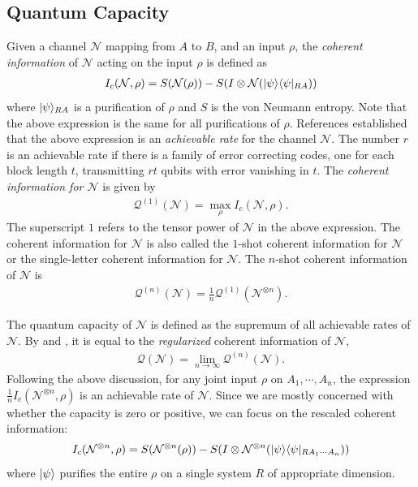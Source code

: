 \documentclass[11pt]{article}
\DeclarePairedDelimiter\bra{\langle}{\rvert}
\DeclarePairedDelimiter\ket{\lvert}{\rangle}
\begin{document}
\subsection{Quantum Capacity}
Given a channel $\mathcal{N}$ mapping from $A$ to $B$, and an input $\rho$, the \emph{coherent information} of $\mathcal{N}$ acting on the input $\rho$ is defined as 
\begin{align}\label{eq:channelcohinfo}
    I_c(\mathcal{N}, \rho) = S(\mathcal{N}(\rho)) - S(I \otimes \mathcal{N}(\ket{\psi}\bra{\psi}_{RA}))
\end{align}
where $\ket{\psi}_{RA}$ is a purification of $\rho$ and $S$ is the von Neumann entropy.  Note that the above expression is the same for all purifications of $\rho$.  
References \cite{lloyd1997capacity,shor2002quantum,devetak2005private} established that the above expression is an \emph{achievable rate} for the channel $\mathcal{N}$.  The number $r$ is an achievable rate if there is a family of error correcting codes, one for each block length $t$,   transmitting $rt$ qubits with error vanishing in $t$.  
The \emph{coherent information for $\mathcal{N}$} is given by 
\begin{align*}
    \mathcal{Q}^{(1)}(\mathcal{N}) = \max_\rho I_c(\mathcal{N},\rho).
\end{align*}
The superscript $1$ refers to the tensor power of $\mathcal{N}$ in the above expression. The coherent information for $\mathcal{N}$ is also called the $1$-shot coherent information for $\mathcal{N}$ or the single-letter coherent information for $\mathcal{N}$.  
The $n$-shot coherent information of $\mathcal{N}$ is 
\begin{align*}
    \mathcal{Q}^{(n)}(\mathcal{N}) = \frac{1}{n} \mathcal{Q}^{(1)}(\mathcal{N}^{\otimes n}) .
\end{align*}



The quantum capacity of $\mathcal{N}$ is defined as the supremum of all achievable rates of $\mathcal{N}$.  By \cite{lloyd1997capacity,shor2002quantum,devetak2005private} and \cite{PhysRevA.57.4153}, it is equal to the \emph{regularized} coherent information of $\mathcal{N}$,
\begin{align}
    \mathcal{Q}(\mathcal{N}) = \lim_{n\rightarrow \infty} \mathcal{Q}^{(n)}(\mathcal{N}). 
\end{align}
Following the above discussion, for any joint input $\rho$ on $A_1, \cdots, A_n$, 
the expression $\frac{1}{n} I_c(\mathcal{N}^{\otimes n},\rho)$ is an achievable rate of $\mathcal{N}$.  Since we are mostly concerned with whether the capacity is zero or positive, we can focus on the rescaled coherent information:  
\begin{align}\label{eq:quantumcapacity}
    I_c(\mathcal{N}^{\otimes n},\rho) = S(\mathcal{N}^{\otimes n}(\rho)) - S(I \otimes \mathcal{N}^{\otimes n}(\ket{\psi}\bra{\psi}_{RA_1 \cdots A_n}))
\end{align}
where $\ket{\psi}$ purifies the entire $\rho$ on a single system $R$ of appropriate dimension.  
\end{document}
